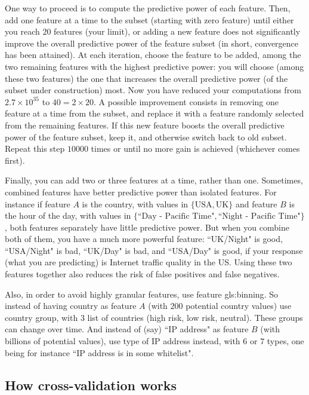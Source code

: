 \documentclass[oneside,10pt]{book}
\begin{document}
One way to proceed is to compute the predictive power of each feature. Then, add one feature at a time to the subset (starting with zero feature) until either you reach 
$20$ features (your limit), or adding a new feature does not significantly improve the overall predictive power of the feature subset (in short, convergence has been attained). At each iteration, choose the feature to be added, among the two remaining features with the highest predictive power: you will choose (among these two features) the one that increases the overall predictive power (of the subset under construction) most. Now you have reduced your computations from 
$2.7 \times 10^{35}$ to $40 = 2 \times 20$. A possible improvement  consists in removing one feature at a time from the subset, and replace it with a feature randomly selected from the remaining features. If this new feature boosts the overall predictive power of the feature subset, keep it, and otherwise switch back to old subset. Repeat this step $\num{10000}$ times or until no more gain is achieved (whichever comes first).

Finally, you can add two or three features at a time, rather than one. Sometimes, combined features have better predictive power than isolated features. For instance if feature $A$ is the country, with values in $\{\text{USA}, \text{UK}\}$ and feature $B$ is the hour of the day, with values in $\{\text{``Day - Pacific Time"}, \text{``Night - Pacific Time"}\}$, both features separately have little predictive power. But when you combine both of them, you have a much more powerful feature: 
``UK/Night" is good, ``USA/Night" is bad, ``UK/Day" is bad, and ``USA/Day" is good, if your response (what you are predicting) is Internet traffic quality in the US. Using these two features together also reduces the risk of false positives and false negatives.

Also, in order to avoid highly granular features, use feature \gls{gls:binning}. So instead of having country as feature $A$ (with $200$ potential country values) use country group, with 3 list of countries (high risk, low risk, neutral). These groups can change over time. And instead of (say) 
 ``IP address" as feature $B$ (with billions of potential values), use type of IP address instead, with $6$ or $7$ types, one being for instance ``IP address is in some whitelist".


\subsection{How cross-validation works}
\end{document}
